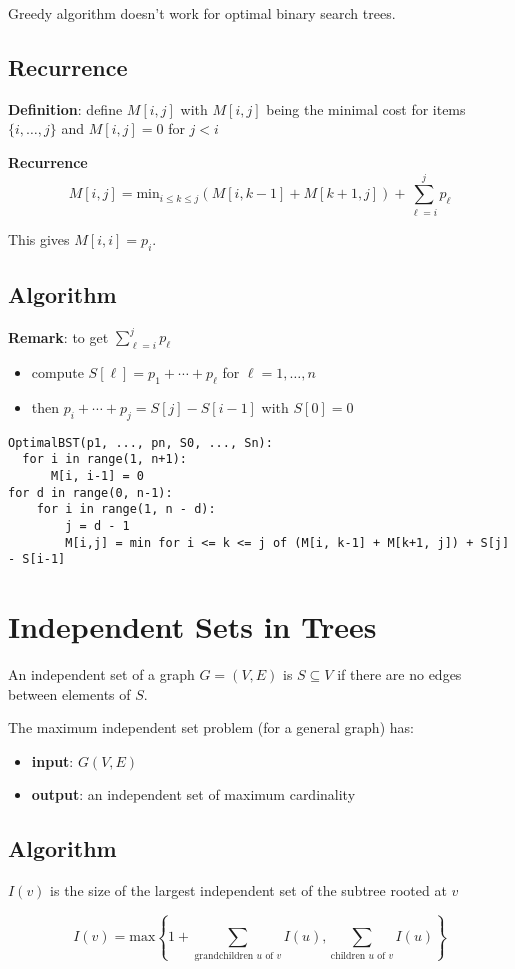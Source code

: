 \documentclass[11pt]{article}
\begin{document}
Greedy algorithm doesn't work for optimal binary search trees.
\subsection{Recurrence}
\label{sec:org32b2a01}
\textbf{Definition}: define \(M[i, j]\) with \(M[i, j]\) being the minimal cost for items \(\{i, \dots, j\}\)
and \(M[i, j] = 0\) for \(j < i\)

\textbf{Recurrence}
$$
M[i,j] = \text{min}_{i \le k \le j} \left(
M[i, k-1] + M[k+1, j]
\right) + \sum_{\ell = i}^{j} p_{\ell}
$$

This gives \(M[i, i] = p_{i}\).
\subsection{Algorithm}
\label{sec:orgbe2acfa}
\textbf{Remark}: to get \(\sum_{\ell = i}^{j} p_{\ell}\)
\begin{itemize}
\item compute \(S[\ell] = p_{1} + \cdots + p_{\ell}\) for \(\ell = 1, \dots, n\)
\item then \(p_{i} + \cdots + p_{j} = S[j] - S[i-1]\) with \(S[0] = 0\)
\end{itemize}

\begin{verbatim}
OptimalBST(p1, ..., pn, S0, ..., Sn):
  for i in range(1, n+1):
      M[i, i-1] = 0
for d in range(0, n-1):
    for i in range(1, n - d):
        j = d - 1
        M[i,j] = min for i <= k <= j of (M[i, k-1] + M[k+1, j]) + S[j] - S[i-1]
\end{verbatim}
\section{Independent Sets in Trees}
\label{sec:orgca7f927}
An independent set of a graph \(G = (V, E)\) is \(S \subseteq V\) if there are no edges between
elements of \(S\).

The maximum independent set problem (for a general graph) has:
\begin{itemize}
\item \textbf{input}: \(G(V, E)\)
\item \textbf{output}: an independent set of maximum cardinality
\end{itemize}
\subsection{Algorithm}
\label{sec:orgedfd97d}
\(I(v)\) is the size of the largest independent set of the subtree rooted at \(v\)

$$
I(v) = \text{max} \left\{ 1 + \sum_{\text{grandchildren $u$ of $v$}} I(u),
\sum_{\text{children $u$ of $v$}} I(u) \right\}
$$
\end{document}
